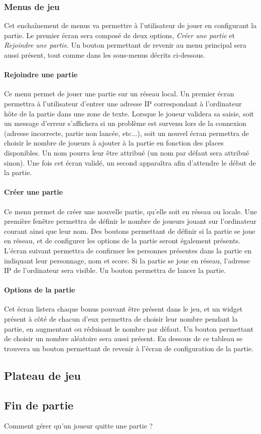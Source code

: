 \subsubsection{Menus de jeu}

Cet enchaînement de menus va permettre à l'utilisateur de jouer en configurant la partie. Le premier écran sera composé de deux options, \emph{Créer une partie} et \emph{Rejoindre une partie}. Un bouton permettant de revenir au menu principal sera aussi présent, tout comme dans les sous-menus décrits ci-dessous.

\paragraph{Rejoindre une partie}

Ce menu permet de jouer une partie sur un réseau local. Un premier écran permettra à l'utilisateur d'entrer une adresse IP correspondant à l'ordinateur hôte de la partie dans une zone de texte. Lorsque le joueur validera sa saisie, soit un message d'erreur s'affichera si un problème est survenu lors de la connexion (adresse incorrecte, partie non lancée, etc...), soit un nouvel écran permettra de choisir le nombre de joueurs à ajouter à la partie en fonction des places disponibles. Un nom pourra leur être attribué (un nom par défaut sera attribué sinon). Une fois cet écran validé, un second apparaîtra afin d'attendre le début de la partie.

\paragraph{Créer une partie}

Ce menu permet de créer une nouvelle partie, qu'elle soit en réseau ou locale. Une première fenêtre permettra de définir le nombre de joueurs jouant sur l'ordinateur courant ainsi que leur nom. Des boutons permettant de définir si la partie se joue en réseau, et de configurer les options de la partie seront également présents. L'écran suivant permettra de confirmer les personnes présentes dans la partie en indiquant leur personnage, nom et score. Si la partie se joue en réseau, l'adresse IP de l'ordinateur sera visible. Un bouton permettra de lancer la partie.

\paragraph{Options de la partie}

Cet écran listera chaque bonus pouvant être présent dans le jeu, et un widget présent à côté de chacun d'eux permettra de choisir leur nombre pendant la partie, en augmentant ou réduisant le nombre par défaut. Un bouton permettant de choisir un nombre aléatoire sera aussi présent. En dessous de ce tableau se trouvera un bouton permettant de revenir à l'écran de configuration de la partie.

\subsection{Plateau de jeu}

\subsection{Fin de partie}

Comment gérer qu'un joueur quitte une partie ?

